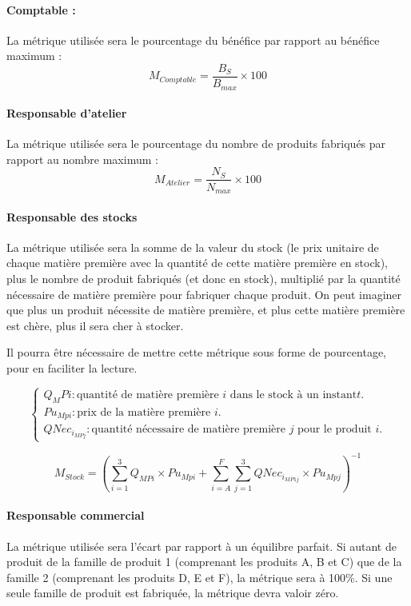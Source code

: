 \paragraph{Comptable :}
La métrique utilisée sera le pourcentage du bénéfice par rapport au bénéfice
maximum :
$$
M_{Comptable} = \frac{B_{S}}{B_{max}} \times 100
$$

\paragraph{Responsable d'atelier}
La métrique utilisée sera le pourcentage du nombre de produits fabriqués par
rapport au nombre maximum :
$$
M_{Atelier} = \frac{N_{S}}{N_{max}} \times 100
$$

\paragraph{Responsable des stocks}
La métrique utilisée sera la somme de la valeur du stock (le prix unitaire
de chaque matière première avec la quantité de cette matière
première en stock), plus le nombre de produit fabriqués (et donc en stock),
multiplié par la quantité nécessaire de matière première pour fabriquer chaque
produit. On peut imaginer que plus un produit nécessite de matière première, et
plus cette matière première est chère, plus il sera cher à stocker.

Il pourra être nécessaire de mettre cette métrique sous forme de pourcentage,
pour en faciliter la lecture.

$$
\begin{cases}
Q_MPi : \text{quantité de matière première } i \text{ dans le stock à un instant} t.\\
Pu_{Mpi} : \text{prix de la matière première } i.\\
QNec_{i_{MPj}} : \text{quantité nécessaire de matière première $j$ pour le produit $i$.}
\end{cases}
$$

$$
M_{Stock} =  \left( 
	     \sum_{i=1}^{3} Q_{MPi} \times Pu_{Mpi} + 
	     \sum_{i=A}^{F} \sum_{j=1}^{3} QNec_{i_{MP1j}} \times Pu_{Mpj}
	     \right)^{-1}
$$

\paragraph{Responsable commercial}
La métrique utilisée sera l'écart par rapport à un équilibre parfait.
Si autant de produit de la famille de produit 1 (comprenant les produits A, B
et C) que de la famille 2 (comprenant les produits D, E et F), la métrique sera
à 100\%.
Si une seule famille de produit est fabriquée, la métrique devra valoir zéro.

